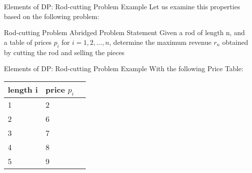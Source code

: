 \begin{frame}{Elements of DP: Rod-cutting Problem Example}
  Let us examine this properties based on the following problem:
  \begin{block}{Rod-cutting Problem Abridged Problem Statement}
  Given a rod of length n, and a table of prices $p_i$ for $i = 1, 2, ..., n$,
determine the maximum revenue $r_n$ obtained by cutting the rod and selling the pieces
  \end{block}
\end{frame}

\begin{frame}{Elements of DP: Rod-cutting Problem Example}
  With the following Price Table:
  \\
  \vspace{2em}
\begin{table}[ht]
  \centering
  \begin{tabular}{l|ll}
    \textbf{length i}&\textbf{price $p_i$}\\\hline
      1 & 2\\
      2 & 6\\
      3 & 7\\
      4 & 8\\
      5 & 9
  \end{tabular}
\end{table}
\end{frame}
